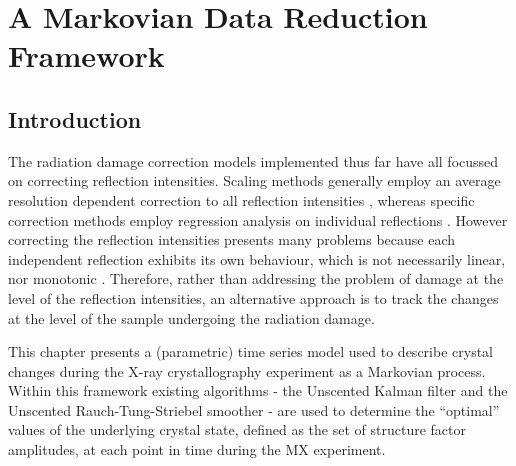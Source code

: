 \chapter{A Markovian Data Reduction Framework}
\label{chap:A Markovian data reduction framework}

\section{Introduction}
\label{sec:Introduction - Data Reduction}
The radiation damage correction models implemented thus far have all focussed on correcting reflection intensities.
Scaling methods generally employ an average resolution dependent correction to all reflection intensities \cite{evans2005,evans2013,kabsch2010integration}, whereas specific correction methods employ regression analysis on individual reflections \cite{diederichs2003,diederichs2006}.
However correcting the reflection intensities presents many problems because each independent reflection exhibits its own behaviour, which is not necessarily linear, nor monotonic \cite{abrahams1987anisotropy}.
Therefore, rather than addressing the problem of damage at the level of the reflection intensities, an alternative approach is to track the changes at the level of the sample undergoing the radiation damage.

This chapter presents a (parametric) time series model used to describe crystal changes during the X-ray crystallography experiment as a Markovian process. Within this framework existing algorithms - the Unscented Kalman filter and the Unscented Rauch-Tung-Striebel smoother - are used to determine the ``optimal'' values of the underlying crystal state, defined as the set of structure factor amplitudes, at each point in time during the MX experiment.
